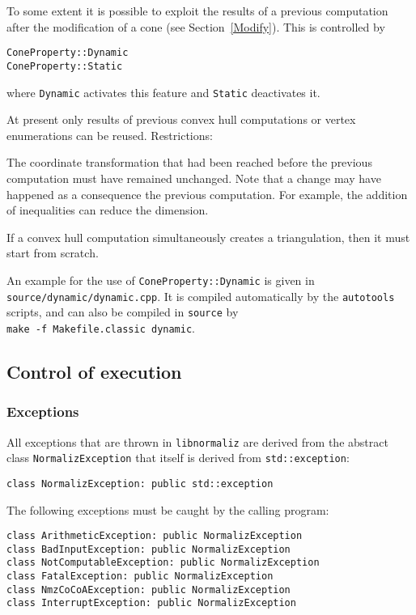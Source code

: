 \begin{small}
To some extent it is possible to exploit the results of a previous computation after the modification of a cone (see Section~\ref{Modify}). This is controlled by
\begin{Verbatim}
ConeProperty::Dynamic
ConeProperty::Static
\end{Verbatim}
where \verb|Dynamic| activates this feature and \verb|Static| deactivates it.

At present only results of previous convex hull computations or vertex enumerations can be reused. Restrictions:
\begin{arab}
	\item The coordinate transformation that had been reached before the previous computation must have remained unchanged. Note that a change may have happened as a consequence the previous computation. For example, the addition of inequalities can reduce the dimension.
	\item If a convex hull computation simultaneously creates a triangulation, then it must start from scratch.
\end{arab}

An example for the use of \verb|ConeProperty::Dynamic| is given in \verb|source/dynamic/dynamic.cpp|. It is compiled automatically by the \verb|autotools| scripts, and can also be compiled in \verb|source| by\\ \verb|make -f Makefile.classic dynamic|.

\subsection{Control of execution}

\subsubsection{Exceptions}

All exceptions that are thrown in \verb|libnormaliz| are derived from the abstract class \verb|NormalizException| that itself is derived from \verb|std::exception|:
\begin{Verbatim}
class NormalizException: public std::exception
\end{Verbatim}

The following exceptions must be caught by the calling program:
\begin{Verbatim}
class ArithmeticException: public NormalizException
class BadInputException: public NormalizException
class NotComputableException: public NormalizException
class FatalException: public NormalizException
class NmzCoCoAException: public NormalizException
class InterruptException: public NormalizException
\end{Verbatim}


\end{small}
